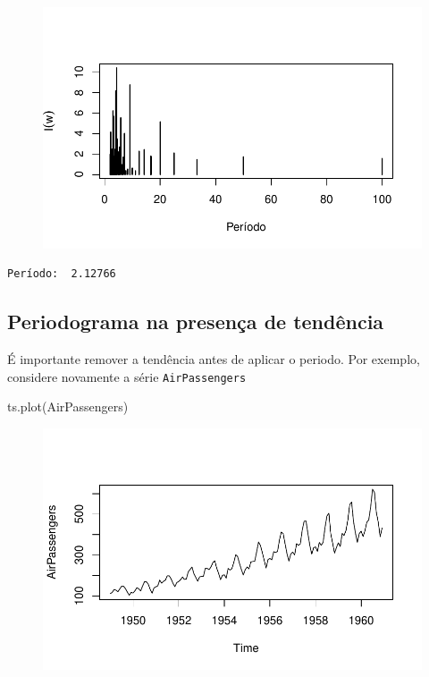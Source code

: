 \documentclass[
  letterpaper,
  DIV=11,
  numbers=noendperiod]{scrreprt}
\newenvironment{Shaded}{\begin{snugshade}}{\end{snugshade}}
\newcommand{\FunctionTok}[1]{\textcolor[rgb]{0.28,0.35,0.67}{#1}}
\newcommand{\NormalTok}[1]{\textcolor[rgb]{0.00,0.23,0.31}{#1}}
\begin{document}
\begin{figure}[H]

{\centering \includegraphics{ferramentas_files/figure-pdf/unnamed-chunk-12-1.pdf}

}

\end{figure}

\begin{verbatim}
Período:  2.12766 
\end{verbatim}

\hypertarget{periodograma-na-presenuxe7a-de-tenduxeancia}{%
\subsection{Periodograma na presença de
tendência}\label{periodograma-na-presenuxe7a-de-tenduxeancia}}

É importante remover a tendência antes de aplicar o periodo. Por
exemplo, considere novamente a série \texttt{AirPassengers}

\begin{Shaded}
\begin{Highlighting}[]
\FunctionTok{ts.plot}\NormalTok{(AirPassengers)}
\end{Highlighting}
\end{Shaded}

\begin{figure}[H]

{\centering \includegraphics{ferramentas_files/figure-pdf/unnamed-chunk-13-1.pdf}

}

\end{figure}
\end{document}
